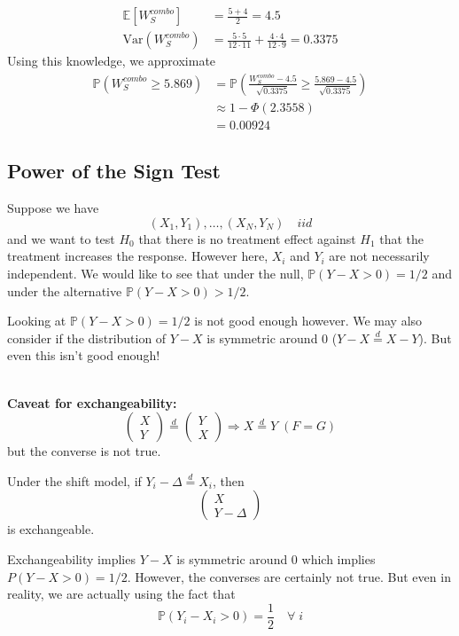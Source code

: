 \documentclass[a4paper,12pt]{amsart}
\newcommand{\Var}{\mbox{Var}}
\newcommand{\E}[1]{\mathbb{E}\left[#1\right]}
\newcommand{\p}[1]{\mathbb{P}\left(#1\right)}
\begin{document}
\begin{align*}
\E{W_S^{combo}} &= \frac{5+4}{2} = 4.5\\
\Var(W_S^{combo}) &= \frac{5 \cdot 5}{12 \cdot 11} + \frac{4 \cdot 4}{12 \cdot 9} = 0.3375
\end{align*}
Using this knowledge, we approximate
\begin{align*}
\p{W_S^{combo} \geq 5.869} &= \p{\frac{W_S^{combo}-4.5}{\sqrt{0.3375}} \geq \frac{5.869 - 4.5}{\sqrt{0.3375}}}\\
&\approx 1 - \Phi(2.3558)\\
&= 0.00924
\end{align*}

\subsection{Power of the Sign Test}
Suppose we have
\[(X_1,Y_1), \ldots, (X_N,Y_N) \quad  iid\]
and we want to test $H_0$ that there is no treatment effect against $H_1$ that the treatment increases the response.
However here, $X_i$ and $Y_i$ are not necessarily independent.
We would like to see that under the null, $\p{Y-X >0} = 1/2$ and under the alternative $\p{Y-X>0}>1/2$.

Looking at  $\p{Y-X >0} = 1/2$ is not good enough however. We may also consider if the distribution of $Y-X$ is symmetric around 0 ($Y-X \overset{d}{=} X-Y$). But even this isn't good enough!

\noindent\\
\textbf{Caveat for exchangeability:}
\[\begin{pmatrix}
X\\Y
\end{pmatrix} \overset{d}{=} \begin{pmatrix}
Y\\X
\end{pmatrix}
\Rightarrow X \overset{d}{=} Y \; (F=G)\]
but the converse is not true.

Under the shift model, if $Y_i - \Delta \overset{d}{=} X_i$, then 
\[\begin{pmatrix}
X\\Y-\Delta
\end{pmatrix}\]
is exchangeable.

Exchangeability implies $Y-X$ is symmetric around 0 which implies $P(Y-X>0)=1/2$. However, the converses are certainly not true. But even in reality, we are actually using the fact that
\[\p{Y_i-X_i>0} = \frac{1}{2} \quad \forall \; i\]
\end{document}
